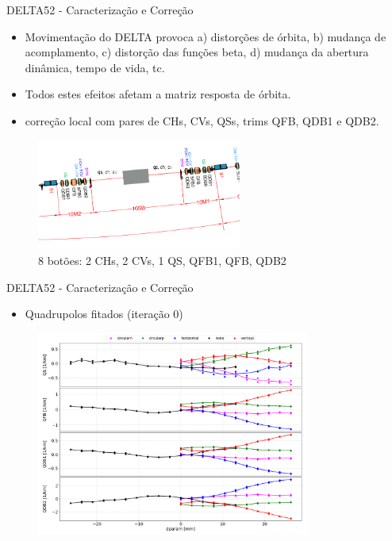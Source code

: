 \documentclass{beamer}					  %
\begin{document}
\begin{frame}{DELTA52 - Caracterização e Correção}
    \begin{itemize}
    		\item Movimentação do DELTA provoca a) distorções de órbita, b) mudança de acomplamento, c) distorção das funções beta, d) mudança da abertura dinâmica, tempo de vida, tc.
            \item Todos estes efeitos afetam a matriz resposta de órbita.
            \item correção local com pares de CHs, CVs, QSs, trims QFB, QDB1 e QDB2.
    \end{itemize}
    \begin{figure}[H]
        	\centering
            \includegraphics[width=0.6\textwidth]{2024-01-26/figures/si-10sb-2.png}
            \caption{\small{8 botões: 2 CHs, 2 CVs, 1 QS, QFB1, QFB, QDB2}}
            \label{fig:bba}
    \end{figure}
\end{frame}


\begin{frame}{DELTA52 - Caracterização e Correção}
    \begin{itemize}
    		\item Quadrupolos fitados (iteração 0)
    \end{itemize}
    \begin{figure}[H]
        	\centering
            \includegraphics[width=0.8\textwidth]{2024-01-26/figures/knobs-before.png}
            \label{fig:bba}
    \end{figure} 
\end{frame}
\end{document}
